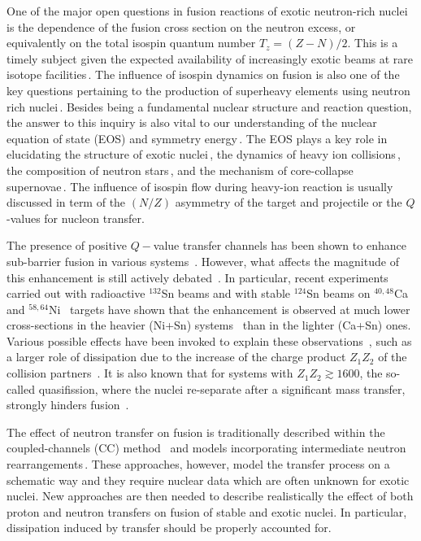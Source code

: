 \documentclass[aps,prl,twocolumn,superscriptaddress,floatfix,10pt]{revtex4-1}
\begin{document}
One of the major open questions in fusion reactions of exotic neutron-rich nuclei
is the dependence of the fusion cross section on the neutron excess,
or equivalently on the total isospin quantum number $T_z = (Z-N)/2$.
This is a timely subject given the expected
availability of increasingly exotic beams at rare isotope facilities\,\cite{balantekin2014}.
The influence of isospin dynamics on fusion is also one of the key questions pertaining to the
production of superheavy elements using neutron rich nuclei\,\cite{loveland2007}.
Besides being a fundamental nuclear structure and reaction question, the answer to this inquiry
is also vital to our understanding of the nuclear equation of state (EOS) and symmetry energy\,\cite{li2014}.
The EOS plays a key role in elucidating the structure of exotic nuclei\,\cite{chen2015},
the dynamics of heavy ion collisions\,\cite{danielewicz2002,tsang2009},
the composition of neutron stars\,\cite{haensel1990,chamel2008,horowitz2004,utama2016}, and the mechanism of core-collapse supernovae\,\cite{bonche1981,watanabe2009,shen2011}.
The influence of isospin flow during heavy-ion reaction is usually discussed in term of the
$(N/Z)$ asymmetry of the target and projectile or the $Q$-values for nucleon transfer.

The presence of positive $Q-$value transfer channels has been shown to enhance sub-barrier fusion in various systems~\cite{jiang2014a}.
However, what affects the magnitude of this enhancement is still actively debated~\cite{kohley2011,kohley2013,kolata2012,jiang2015,liang2016}.
In particular, recent experiments carried out
with radioactive $^{132}$Sn beams and with stable $^{124}$Sn beams on
$^{40,48}$Ca~\cite{kolata2012} and $^{58,64}$Ni~\cite{kohley2011} targets have shown that the enhancement is observed at much lower cross-sections in the heavier (Ni+Sn) systems~\cite{jiang2015} than in the lighter (Ca+Sn) ones.
Various possible effects have been invoked to explain these observations~\cite{liang2016},
such as a larger role of dissipation due to the increase of the charge product $Z_1Z_2$ of the collision partners~\cite{wolfs1987,evers2011,rafferty2016}.
It is also known that for systems with $Z_1Z_2\gtrsim1600$, the so-called quasifission, where the nuclei re-separate after a significant mass transfer, strongly hinders fusion~\cite{toke1985}.

The effect of neutron transfer on fusion is traditionally described  within the coupled-channels (CC) method~\cite{rowley1992,esbensen1998,hagino2012}
and models incorporating intermediate neutron
rearrangements\,\cite{zagrebaev2003,zagrebaev2007c,karpov2015}.
These approaches, however, model the transfer process on a schematic way
and they require nuclear data which are often unknown for exotic nuclei.
New approaches are then needed to describe realistically the effect of both proton and neutron transfers on fusion of stable and exotic nuclei.
In particular, dissipation induced by transfer should be properly accounted for.
\end{document}
